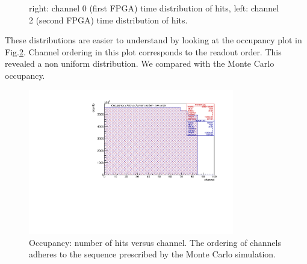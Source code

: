 \begin{figure}[H]
  \hspace{-0.5in}
  \caption{
    \label{fig:1}
    right: channel 0 (first FPGA) time distribution of hits, left: channel 2 (second FPGA) time distribution of hits.
  }
\end{figure}
These distributions are easier to understand by looking at the occupancy plot in Fig.\ref{fig:2}. Channel ordering in this plot corresponds to the readout order.
This revealed a non uniform distribution. We compared with the Monte Carlo occupancy.
\begin{figure}[!h]
\centering
\includegraphics[width =0.8\textwidth]{figures/pdf/figure_00004_nhitsvschannel_roc_simulation_281}
\caption{Occupancy: number of hits versus channel. The ordering of channels adheres to the sequence prescribed by the Monte Carlo simulation.}
\label{fig:2}
\end{figure}

